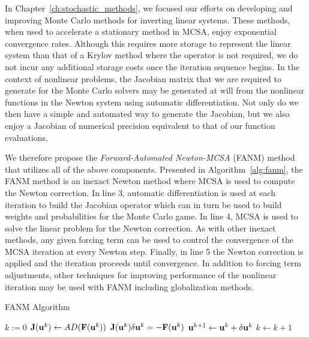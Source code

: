 In Chapter~\ref{ch:stochastic_methods}, we focused our efforts on
developing and improving Monte Carlo methods for inverting linear
systems. These methods, when used to accelerate a stationary method in
MCSA, enjoy exponential convergence rates. Although this requires more
storage to represent the linear system than that of a Krylov method
where the operator is not required, we do not incur any additional
storage costs once the iteration sequence begins. In the context of
nonlinear problems, the Jacobian matrix that we are required to
generate for the Monte Carlo solvers may be generated at will from the
nonlinear functions in the Newton system using automatic
differentiation. Not only do we then have a simple and automated way
to generate the Jacobian, but we also enjoy a Jacobian of numerical
precision equivalent to that of our function evaluations.

We therefore propose the \textit{Forward-Automated Newton-MCSA} (FANM)
method that utilizes all of the above components. Presented in
Algorithm~\ref{alg:fanm}, the FANM method is an inexact Newton method
where MCSA is used to compute the Newton correction. In line 3,
automatic differentiation is used at each iteration to build the
Jacobian operator which can in turn be used to build weights and
probabilities for the Monte Carlo game. In line 4, MCSA is used to
solve the linear problem for the Newton correction. As with other
inexact methods, any given forcing term can be used to control the
convergence of the MCSA iteration at every Newton step. Finally, in
line 5 the Newton correction is applied and the iteration proceeds
until convergence. In addition to forcing term adjustments, other
techniques for improving performance of the nonlinear iteration may be
used with FANM including globalization methods.

\begin{algorithm}[h!]
  \caption{FANM Algorithm}
  \label{alg:fanm}
  \begin{algorithmic}[1]
    \State $k := 0$ 
    \State $\mathbf{J}(\mathbf{u}^{k}) \leftarrow AD(\mathbf{F}(\mathbf{u}^k))$ 
    \State $\mathbf{J}(\mathbf{u}^k) \delta \mathbf{u}^k = -\mathbf{F}(\mathbf{u}^{k})$
    \State $\mathbf{u}^{k+1} \leftarrow \mathbf{u}^k + \delta \mathbf{u}^k$ 
    \State $k \leftarrow k+1$ 
    \EndWhile
  \end{algorithmic}
\end{algorithm}

